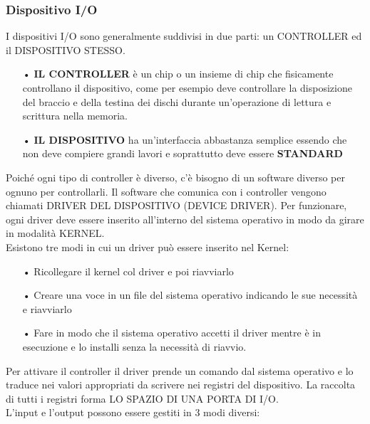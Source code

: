 \documentclass{article}
\begin{document}
\subsubsection{Dispositivo I/O}
I dispositivi I/O sono generalmente suddivisi in due parti: un CONTROLLER ed il DISPOSITIVO STESSO.
\begin{enumerate}
   \item[•] \textbf{IL CONTROLLER} è un chip o un insieme di chip che fisicamente controllano il dispositivo, come per esempio deve controllare la disposizione del braccio e della testina dei dischi durante un’operazione di lettura e scrittura nella memoria.
   \item[•] \textbf{IL DISPOSITIVO} ha un'interfaccia abbastanza semplice essendo che non deve compiere grandi lavori e soprattutto deve essere \textbf{STANDARD}
\end{enumerate}
Poiché ogni tipo di controller è diverso, c’è bisogno di un software diverso per ognuno per controllarli. Il software che comunica con i controller vengono chiamati DRIVER DEL DISPOSITIVO (DEVICE DRIVER). Per funzionare, ogni driver deve essere inserito all’interno del sistema operativo in modo da girare in modalità KERNEL.
\\
Esistono tre modi in cui un driver può essere inserito nel Kernel:
\begin{enumerate}
   \item[•] Ricollegare il kernel col driver e poi riavviarlo
   \item[•] Creare una voce in un file del sistema operativo indicando le sue necessità e riavviarlo
   \item[•] Fare in modo che il sistema operativo accetti il driver mentre è in esecuzione e lo installi senza la necessità di riavvio.
\end{enumerate}
Per attivare il controller il driver prende un comando dal sistema operativo e lo traduce nei valori appropriati da scrivere nei registri del dispositivo. La raccolta di tutti i registri forma LO SPAZIO DI UNA PORTA DI I/O.
\\
L’input e l’output possono essere gestiti in 3 modi diversi:
\end{document}
